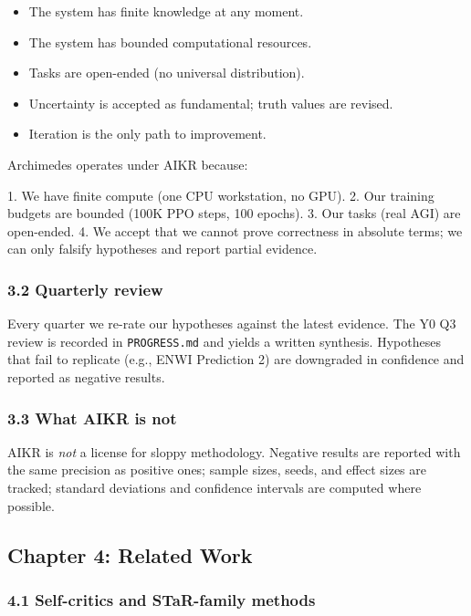 \documentclass[11pt]{article}
\begin{document}
\begin{itemize}
  \item The system has finite knowledge at any moment.
  \item The system has bounded computational resources.
  \item Tasks are open-ended (no universal distribution).
  \item Uncertainty is accepted as fundamental; truth values are revised.
  \item Iteration is the only path to improvement.
\end{itemize}


Archimedes operates under AIKR because:

1. We have finite compute (one CPU workstation, no GPU).
2. Our training budgets are bounded (100K PPO steps, 100 epochs).
3. Our tasks (real AGI) are open-ended.
4. We accept that we cannot prove correctness in absolute terms; we can only falsify
   hypotheses and report partial evidence.

\subsubsection{3.2 Quarterly review}

Every quarter we re-rate our hypotheses against the latest evidence. The Y0 Q3
review is recorded in \texttt{PROGRESS.md} and yields a written synthesis. Hypotheses that
fail to replicate (e.g., ENWI Prediction 2) are downgraded in confidence and
reported as negative results.

\subsubsection{3.3 What AIKR is not}

AIKR is \textit{not} a license for sloppy methodology. Negative results are reported with
the same precision as positive ones; sample sizes, seeds, and effect sizes are
tracked; standard deviations and confidence intervals are computed where possible.

\hrulefill

\subsection{Chapter 4: Related Work}

\subsubsection{4.1 Self-critics and STaR-family methods}
\end{document}
